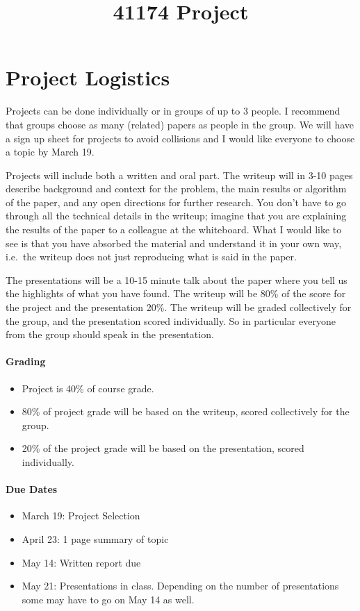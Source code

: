 \documentclass[12pt]{article}
\begin{document}
\title{41174 Project}
\date{}
\maketitle

\section*{Project Logistics}
Projects can be done individually or in groups of up to 3 people.  I recommend that groups choose as many (related) papers as people in the group.  We will have a sign up sheet for 
projects to avoid collisions and I would like everyone to choose a topic by March 19.  

Projects will include both a written and oral part.  The writeup will in 3-10 pages describe background and context for the problem, the main results or algorithm of the paper, and any open directions 
for further research.  You don't have to go through all the technical details in the writeup; imagine that you are explaining the results of the paper to a colleague at the whiteboard.  What 
I would like to see is that you have absorbed the material and understand it in your own way, i.e.\ the writeup does not just reproducing what is said in the paper.  

The presentations will be a 10-15 minute talk about the paper where you tell us the highlights of what you have found.  The writeup will be 80\% of the 
score for the project and the presentation 20\%.  The writeup will be graded collectively for the group, and the presentation scored individually.  So in particular everyone from the group should 
speak in the presentation.

\paragraph*{Grading}
\begin{itemize}
  \item Project is 40\% of course grade.
  \item 80\% of project grade will be based on the writeup, scored collectively for the group.
  \item 20\% of the project grade will be based on the presentation, scored individually.
\end{itemize}

\paragraph*{Due Dates}
\begin{itemize}
  \item March 19: Project Selection 
  \item April 23: 1 page summary of topic
  \item May 14: Written report due
  \item May 21: Presentations in class.  Depending on the number of presentations some may have to go on May 14 as well.
\end{itemize}
\end{document}
